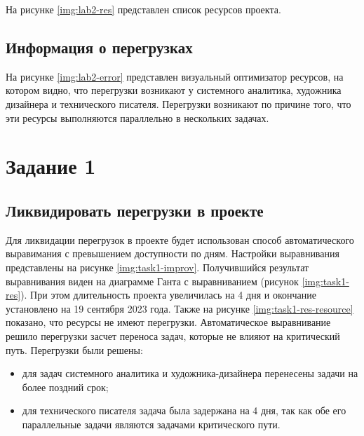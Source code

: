 На рисунке \ref{img:lab2-res} представлен список ресурсов проекта.



\subsection{Информация о перегрузках}

На рисунке \ref{img:lab2-error} представлен визуальный оптимизатор ресурсов, на котором видно, что перегрузки возникают у системного аналитика, художника дизайнера и технического писателя. Перегрузки возникают по причине того, что эти ресурсы выполняются параллельно в нескольких задачах.



\section{Задание 1}

\subsection{Ликвидировать перегрузки в проекте}

Для ликвидации перегрузок в проекте будет использован способ автоматического выравимания с превышением доступности по дням. Настройки выравнивания представлены на рисунке \ref{img:task1-improv}. Получившийся результат выравнивания виден на диаграмме Ганта с выравниванием (рисунок \ref{img:task1-res}). При этом длительность проекта увеличилась на 4 дня и окончание установлено на 19 сентября 2023 года. Также на рисунке \ref{img:task1-res-resource} показано, что ресурсы не имеют перегрузки. Автоматическое выравнивание решило перегрузки засчет переноса задач, которые не влияют на критический путь. Перегрузки были решены:

\begin{itemize}
    \item для задач системного аналитика и художника-дизайнера перенесены задачи на более поздний срок;
    \item для технического писателя задача была задержана на 4 дня, так как обе его параллельные задачи являются задачами критического пути.
\end{itemize}




